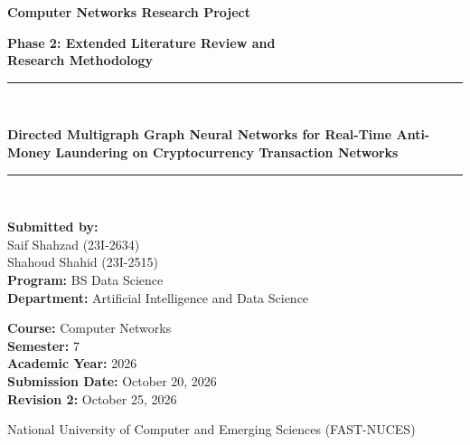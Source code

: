\documentclass[11pt,a4paper]{article}
\begin{document}
\begin{titlepage}
    \centering
    \vspace*{1.5cm}

    {\huge\bfseries Computer Networks Research Project\par}
    \vspace{0.8cm}
    {\LARGE\bfseries Phase 2: Extended Literature Review and\\Research Methodology\par}
    \vspace{1.2cm}

    \rule{\linewidth}{1.2pt}\\[0.4cm]
    {\Large\bfseries Directed Multigraph Graph Neural Networks for Real-Time Anti-Money Laundering on Cryptocurrency Transaction Networks\par}
    \rule{\linewidth}{1.2pt}\\[1.5cm]

    \begin{minipage}{0.48\textwidth}
        \begin{flushleft} \large
            \textbf{Submitted by:}\\[0.2cm]
            Saif Shahzad (23I-2634)\\
            Shahoud Shahid (23I-2515)\\[0.4cm]
            \textbf{Program:} BS Data Science\\
            \textbf{Department:} Artificial Intelligence and Data Science
        \end{flushleft}
    \end{minipage}
    \hfill
    \begin{minipage}{0.48\textwidth}
        \begin{flushright} \large
            \textbf{Course:} Computer Networks\\
            \textbf{Semester:} 7\\
            \textbf{Academic Year:} 2026\\
            \textbf{Submission Date:} October 20, 2026\\
            \textbf{Revision 2:} October 25, 2026
        \end{flushright}
    \end{minipage}

    \vfill
    {\large National University of Computer and Emerging Sciences (FAST-NUCES)\par}
    \vspace*{1cm}
\end{titlepage}
\end{document}
